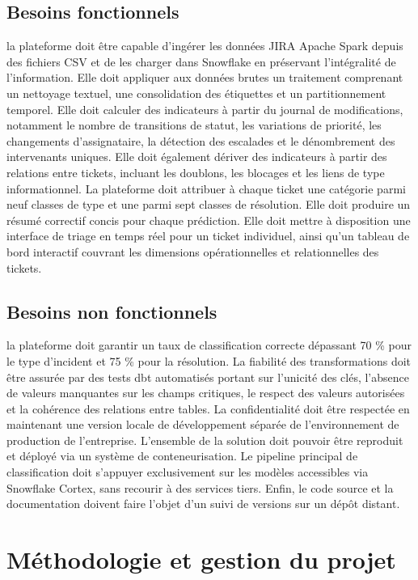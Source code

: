 \subsection{Besoins fonctionnels}
 la plateforme doit être capable d'ingérer les données JIRA Apache Spark depuis des fichiers CSV et de les charger dans Snowflake en préservant l'intégralité de l'information. Elle doit appliquer aux données brutes un traitement comprenant un nettoyage textuel, une consolidation des étiquettes et un partitionnement temporel. Elle doit calculer des indicateurs à partir du journal de modifications, notamment le nombre de transitions de statut, les variations de priorité, les changements d'assignataire, la détection des escalades et le dénombrement des intervenants uniques. Elle doit également dériver des indicateurs à partir des relations entre tickets, incluant les doublons, les blocages et les liens de type informationnel. La plateforme doit attribuer à chaque ticket une catégorie parmi neuf classes de type et une parmi sept classes de résolution. Elle doit produire un résumé correctif concis pour chaque prédiction. Elle doit mettre à disposition une interface de triage en temps réel pour un ticket individuel, ainsi qu'un tableau de bord interactif couvrant les dimensions opérationnelles et relationnelles des tickets.

\subsection{Besoins non fonctionnels}
la plateforme doit garantir un taux de classification correcte dépassant 70 \% pour le type d'incident et 75 \% pour la résolution. La fiabilité des transformations doit être assurée par des tests dbt automatisés portant sur l'unicité des clés, l'absence de valeurs manquantes sur les champs critiques, le respect des valeurs autorisées et la cohérence des relations entre tables. La confidentialité doit être respectée en maintenant une version locale de développement séparée de l'environnement de production de l'entreprise. L'ensemble de la solution doit pouvoir être reproduit et déployé via un système de conteneurisation. Le pipeline principal de classification doit s'appuyer exclusivement sur les modèles accessibles via Snowflake Cortex, sans recourir à des services tiers. Enfin, le code source et la documentation doivent faire l'objet d'un suivi de versions sur un dépôt distant.

\section{Méthodologie et gestion du projet}
